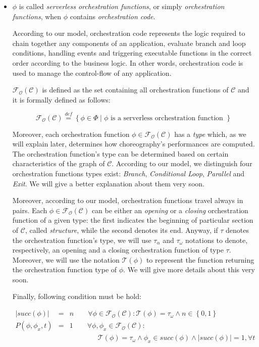 \documentclass[12pt,a4paper]{report}
\newcommand{\mathDef}{\overset{\textit{def}}{=}}
\begin{document}
\begin{itemize}
	\item $\phi$ is called \textit{serverless orchestration functions}, or simply \textit{orchestration functions}, when $\phi$ contains \textit{orchestration code}. 
	
	According to our model, orchestration code represents the logic required to chain together any components of an application, evaluate branch and loop conditions, handling events and triggering executable functions in the correct order according to the business logic. In other words, orchestration code is used to manage the control-flow of any application.
	
	$\mathscr{F_O}(\mathcal{C})$ is defined as the set containing all orchestration functions of $\mathcal{C}$ and it is formally defined as follows:
	
	\begin{equation}
		\mathscr{F_O}(\mathcal{C}) \mathDef \left\lbrace \phi \in \Phi \mid \phi \text{ is a serverless orchestration function }\right\rbrace 
	\end{equation}

	Moreover, each orchestration function $\phi \in \mathscr{F_O}(\mathcal{C})$ has a \textit{type} which, as we will explain later, determines how choreography's performances are computed. The orchestration function's type can be determined based on certain characteristics of the graph of $\mathcal{C}$. According to our model, we distinguish four orchestration functions types exist: \textit{Branch}, \textit{Conditional Loop}, \textit{Parallel} and \textit{Exit}. We will give a better explanation about them very soon.

	Moreover, according to our model, orchestration functions travel always in pairs. Each $\phi \in \mathscr{F_O}(\mathcal{C})$ can be either an \textit{opening} or a \textit{closing} orchestration function of a given type: the first indicates the beginning of particular section of $\mathcal{C}$, called \textit{structure}, while the second denotes its  end. Anyway, if $\tau$ denotes the orchestration function's type, we will use $\tau_{\alpha}$ and $\tau_{\omega}$ notations to denote, respectively, an opening and a closing orchestration function of type $\tau$. Moreover, we will use the notation $\mathscr{T}(\phi)$ to represent the function returning the orchestration function type of $\phi$. We will give more details about this very soon.
	
	Finally, following condition must be hold:
	
	\begin{eqnarray}
		|succ(\phi)| & = & n \qquad \forall \phi \in \mathscr{F_O}(\mathcal{C}) : \mathscr{T}(\phi) = \tau_{\omega} \wedge n \in \left\{0,1\right\} \\		
		P(\phi, \phi_x,t) & = & 1 \qquad \forall \phi, \phi_x \in \mathscr{F_O}(\mathcal{C}) : \\		
		& & \qquad \qquad \mathscr{T}(\phi) = \tau_{\omega} \wedge \phi_x \in succ(\phi) \wedge |succ(\phi)| = 1, \forall t \qquad \qquad  \\
	\end{eqnarray}
	
\end{itemize}
\end{document}
